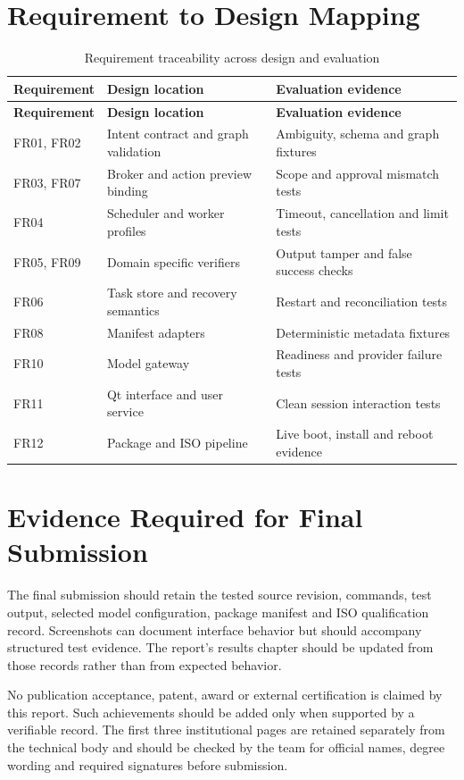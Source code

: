 \section{Requirement to Design Mapping}
\begin{longtable}{P{23mm}P{63mm}P{52mm}}
\caption{Requirement traceability across design and evaluation}\\
\toprule\textbf{Requirement} & \textbf{Design location} & \textbf{Evaluation evidence}\\\midrule\endfirsthead
\toprule\textbf{Requirement} & \textbf{Design location} & \textbf{Evaluation evidence}\\\midrule\endhead
FR01, FR02 & Intent contract and graph validation & Ambiguity, schema and graph fixtures\\
FR03, FR07 & Broker and action preview binding & Scope and approval mismatch tests\\
FR04 & Scheduler and worker profiles & Timeout, cancellation and limit tests\\
FR05, FR09 & Domain specific verifiers & Output tamper and false success checks\\
FR06 & Task store and recovery semantics & Restart and reconciliation tests\\
FR08 & Manifest adapters & Deterministic metadata fixtures\\
FR10 & Model gateway & Readiness and provider failure tests\\
FR11 & Qt interface and user service & Clean session interaction tests\\
FR12 & Package and ISO pipeline & Live boot, install and reboot evidence\\\bottomrule
\end{longtable}

\section{Evidence Required for Final Submission}
The final submission should retain the tested source revision, commands, test output, selected model configuration, package manifest and ISO qualification record. Screenshots can document interface behavior but should accompany structured test evidence. The report's results chapter should be updated from those records rather than from expected behavior.

No publication acceptance, patent, award or external certification is claimed by this report. Such achievements should be added only when supported by a verifiable record. The first three institutional pages are retained separately from the technical body and should be checked by the team for official names, degree wording and required signatures before submission.
